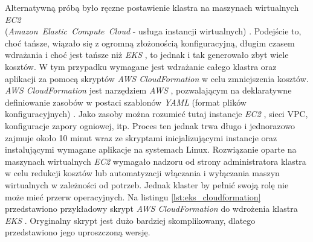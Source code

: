 Alternatywną próbą było ręczne postawienie klastra na maszynach wirtualnych \textit{EC2} \\ (\mbox{\textit{Amazon Elastic Compute Cloud}} - usługa instancji wirtualnych) \cite{ec2_docs}. Podejście to, choć tańsze, wiązało się z ogromną złożonością konfiguracyjną, długim czasem wdrażania i choć jest tańsze niż \textit{EKS} \cite{eks_docs}, to jednak i tak generowało zbyt wiele kosztów. W tym przypadku wymagane jest wdrażanie całego klastra oraz aplikacji za pomocą skryptów \textit{AWS CloudFormation} \cite{cloudformation_docs} w celu zmniejszenia kosztów. \textit{AWS CloudFormation} \cite{cloudformation_docs} jest narzędziem \textit{AWS} \cite{aws_docs}, pozwalającym na deklaratywne definiowanie zasobów w postaci szablonów \textit{YAML} (format plików konfiguracyjnych) \cite{yaml_spec}. Jako zasoby można rozumieć tutaj instancje \textit{EC2} \cite{ec2_docs}, sieci VPC, konfiguracje zapory ogniowej, itp. Proces ten jednak trwa długo i jednorazowo zajmuje około 10 minut wraz ze skryptami inicjalizującymi instancje oraz instalującymi wymagane aplikacje na systemach Linux. Rozwiązanie oparte na maszynach wirtualnych \textit{EC2} \cite{ec2_docs} wymagało nadzoru od strony administratora klastra w celu redukcji kosztów lub automatyzacji włączania i wyłączania maszyn wirtualnych w zależności od potrzeb. Jednak klaster by pełnić swoją rolę nie może mieć przerw operacyjnych. Na listingu \ref{lst:eks_cloudformation} przedstawiono przykładowy skrypt \textit{AWS CloudFormation} \cite{cloudformation_docs} do wdrożenia klastra \textit{EKS} \cite{eks_docs}. Oryginalny skrypt jest dużo bardziej skomplikowany, dlatego przedstawiono jego uproszczoną wersję.

